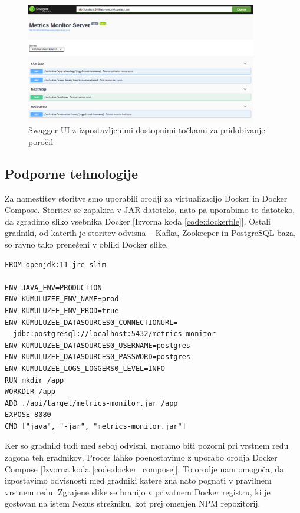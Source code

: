 \documentclass[a4paper, 12pt]{book}
\begin{document}
\begin{figure}[!htb]
	\begin{center}
		\includegraphics[width=0.9\textwidth]{swagger.png}
	\end{center}
	\caption{Swagger UI z izpostavljenimi dostopnimi točkami za pridobivanje poročil}
	\label{img:swagger}
\end{figure}

\subsection{Podporne tehnologije}
\label{ch3:sec2:sub3}

Za namestitev storitve smo uporabili orodji za virtualizacijo Docker in Docker Compose. Storitev se zapakira v JAR datoteko, nato pa uporabimo to datoteko, da zgradimo sliko vsebnika Docker [Izvorna koda \ref{code:dockerfile}]. Ostali gradniki, od katerih je storitev odvisna -- Kafka, Zookeeper in PostgreSQL baza, so ravno tako prenešeni v obliki Docker slike.\newline

\begin{lstlisting}[label=code:dockerfile, caption=Dockerfile za storitev]
FROM openjdk:11-jre-slim

ENV JAVA_ENV=PRODUCTION
ENV KUMULUZEE_ENV_NAME=prod
ENV KUMULUZEE_ENV_PROD=true
ENV KUMULUZEE_DATASOURCES0_CONNECTIONURL=
  jdbc:postgresql://localhost:5432/metrics-monitor
ENV KUMULUZEE_DATASOURCES0_USERNAME=postgres
ENV KUMULUZEE_DATASOURCES0_PASSWORD=postgres
ENV KUMULUZEE_LOGS_LOGGERS0_LEVEL=INFO
RUN mkdir /app
WORKDIR /app
ADD ./api/target/metrics-monitor.jar /app
EXPOSE 8080
CMD ["java", "-jar", "metrics-monitor.jar"]
\end{lstlisting} 

Ker so gradniki tudi med seboj odvisni, moramo biti pozorni pri vrstnem redu zagona teh gradnikov. Proces lahko poenostavimo z uporabo orodja Docker Compose [Izvorna koda \ref{code:docker_compose}]. To orodje nam omogoča, da izpostavimo odvisnosti med gradniki katere zna nato pognati v pravilnem vrstnem redu. Zgrajene slike se hranijo v privatnem Docker registru, ki je gostovan na istem Nexus strežniku, kot prej omenjen NPM repozitorij.
\end{document}
